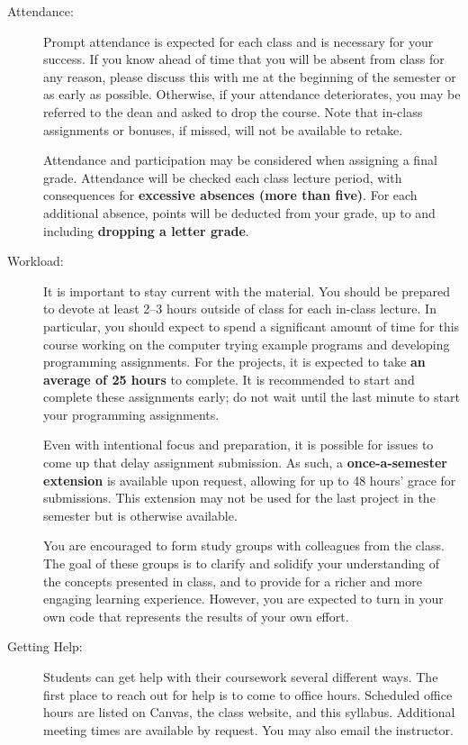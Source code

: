 \documentclass [letterpaper,11pt]{article}
\begin{document}
\begin{description}
\item[Attendance:]
Prompt attendance is expected for each class and is necessary for your success. If you know ahead of time that you will be
absent from class for any reason, please discuss this with me at the beginning of the semester
or as early as possible. Otherwise, if your attendance deteriorates, you may be referred to the dean and asked to drop the course. Note that in-class assignments or bonuses, if missed, will not be available to retake.

Attendance and participation may be considered when assigning a final grade.
Attendance will be checked each class lecture period, with consequences for \textbf{excessive absences (more than five)}.  For each additional absence, points will be deducted from your grade, up to and including \textbf{dropping a letter grade}.

\item[Workload:]
It is important to stay current with the material.  You should be prepared to devote at least 2--3 hours outside of class for each in-class lecture.  In particular, you should expect to spend a significant amount of time for this course working on the computer trying example programs and developing programming assignments. For the projects, it is expected to take \textbf{an average of 25 hours} to complete. It is recommended to start and complete these assignments early; do not wait until the last minute to start your programming assignments. 

Even with intentional focus and preparation, it is possible for issues to come up that delay assignment submission.  As such, a \textbf{once-a-semester extension} is available upon request, allowing for up to 48 hours' grace for submissions. This extension may not be used for the last project in the semester but is otherwise available.

You are encouraged to form study groups with colleagues from the class. The goal of these groups is to clarify and solidify your understanding of the concepts presented in class, and to provide for a richer and more engaging learning experience. However, you are expected to turn in your own code that represents the results of your own effort.

\item[Getting Help:]
Students can get help with their coursework several different ways. The first place to
reach out for help is to come to office hours. Scheduled office hours are listed on Canvas, the class website, and this syllabus.
Additional meeting times are available by request. You may also email the instructor.


\end{description}
\end{document}
